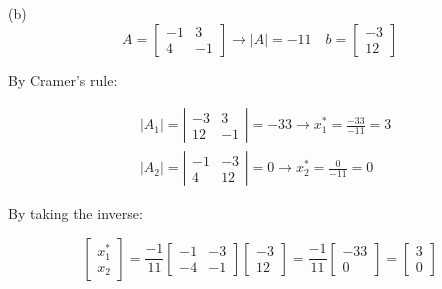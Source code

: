 \documentclass{./../../Latex/homework}
\begin{document}
\begin{enumerate}
(b)
$$
A=\left[\begin{array}{cc}
-1 & 3 \\
4 & -1
\end{array}\right] \rightarrow|A|=-11 \quad b=\left[\begin{array}{c}
-3 \\
12
\end{array}\right]
$$

By Cramer's rule:

$$
\begin{aligned}
& \left|A_{1}\right|=\left|\begin{array}{cc}
-3 & 3 \\
12 & -1
\end{array}\right|=-33 \rightarrow x_{1}^{*}=\frac{-33}{-11}=3 \\
& \left|A_{2}\right|=\left|\begin{array}{cc}
-1 & -3 \\
4 & 12
\end{array}\right|=0 \rightarrow x_{2}^{*}=\frac{0}{-11}=0
\end{aligned}
$$

By taking the inverse:

$$
\left[\begin{array}{l}
x_{1}^{*} \\
x_{2}
\end{array}\right]=\frac{-1}{11}\left[\begin{array}{cc}
-1 & -3 \\
-4 & -1
\end{array}\right]\left[\begin{array}{c}
-3 \\
12
\end{array}\right]=\frac{-1}{11}\left[\begin{array}{c}
-33 \\
0
\end{array}\right]=\left[\begin{array}{l}
3 \\
0
\end{array}\right] 
$$


\end{enumerate}
\end{document}
